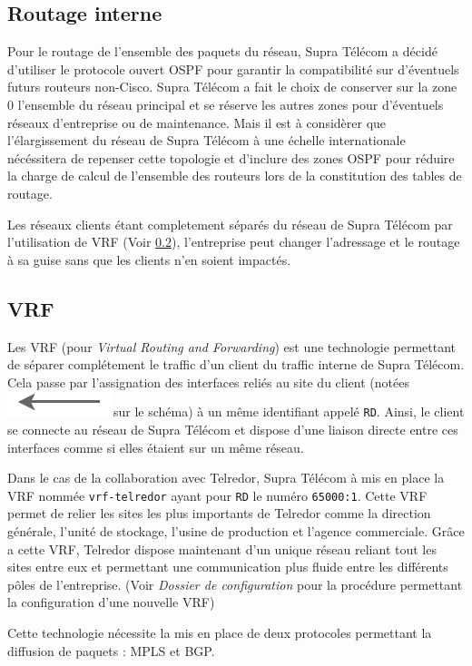 \documentclass{article}
\newcommand{\tlr}{Telredor\xspace}
\newcommand{\spr}{Supra Télécom\xspace}
\newcommand{\flechevrf}{\includegraphics[scale=0.4]{img/lien-vrf-fleche}}
\begin{document}
\bigskip

\subsection{Routage interne}

Pour le routage de l'ensemble des paquets du réseau, \spr a décidé d'utiliser le protocole ouvert OSPF pour garantir la compatibilité sur d'éventuels futurs routeurs non-Cisco.
\spr a fait le choix de conserver sur la zone 0 l'ensemble du réseau principal et se réserve les autres zones pour d'éventuels réseaux d'entreprise ou de maintenance.
Mais il est à considèrer que l'élargissement du réseau de \spr à une échelle internationale nécéssitera de repenser cette topologie et d'inclure des zones OSPF pour réduire la charge de calcul de l'ensemble des routeurs lors de la constitution des tables de routage.

Les réseaux clients étant completement séparés du réseau de \spr par l'utilisation de VRF (Voir \ref{vrf}), l'entreprise peut changer l'adressage et le routage à sa guise sans que les clients n'en soient impactés.

\subsection{VRF}
\label{vrf}

Les VRF (pour \emph{Virtual Routing and Forwarding}) est une technologie permettant de séparer complétement le traffic d'un client du traffic interne de \spr.
Cela passe par l'assignation des interfaces reliés au site du client (notées \flechevrf sur le schéma) à un même identifiant appelé \texttt{RD}.
Ainsi, le client se connecte au réseau de \spr et dispose d'une liaison directe entre ces interfaces comme si elles étaient sur un même réseau.

Dans le cas de la collaboration avec \tlr, \spr à mis en place la VRF nommée \texttt{vrf-telredor} ayant pour \texttt{RD} le numéro \texttt{65000:1}.
Cette VRF permet de relier les sites les plus importants de \tlr comme la direction générale, l'unité de stockage, l'usine de production et l'agence commerciale.
Grâce a cette VRF, \tlr dispose maintenant d'un unique réseau reliant tout les sites entre eux et permettant une communication plus fluide entre les différents pôles de l'entreprise. (Voir \emph{Dossier de configuration} pour la procédure permettant la configuration d'une nouvelle VRF)

Cette technologie nécessite la mis en place de deux protocoles permettant la diffusion de paquets : MPLS et BGP.
\end{document}
